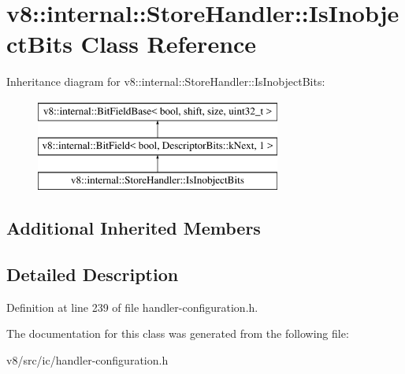 \hypertarget{classv8_1_1internal_1_1StoreHandler_1_1IsInobjectBits}{}\section{v8\+:\+:internal\+:\+:Store\+Handler\+:\+:Is\+Inobject\+Bits Class Reference}
\label{classv8_1_1internal_1_1StoreHandler_1_1IsInobjectBits}
Inheritance diagram for v8\+:\+:internal\+:\+:Store\+Handler\+:\+:Is\+Inobject\+Bits\+:\begin{figure}[H]
\begin{center}
\leavevmode
\includegraphics[height=3.000000cm]{classv8_1_1internal_1_1StoreHandler_1_1IsInobjectBits}
\end{center}
\end{figure}
\subsection*{Additional Inherited Members}


\subsection{Detailed Description}


Definition at line 239 of file handler-\/configuration.\+h.



The documentation for this class was generated from the following file\+:\begin{DoxyCompactItemize}
\item 
v8/src/ic/handler-\/configuration.\+h\end{DoxyCompactItemize}
